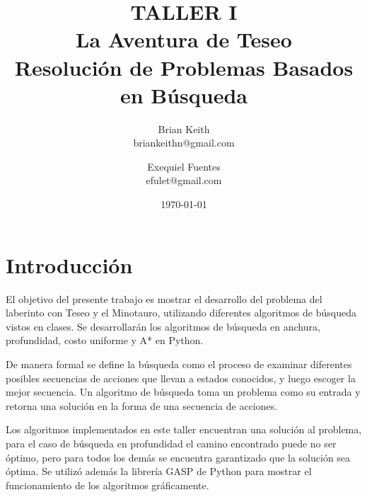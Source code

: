 \documentclass[letter, titlepage, 10pt]{article}
\title{TALLER I \\ La Aventura de Teseo \\ Resolución de Problemas Basados en Búsqueda} %
\author{Brian Keith\\
  \small briankeithn@gmail.com\\
\and
  Exequiel Fuentes\\
  \small efulet@gmail.com\\
}
\date{\today}
\begin{document}
\maketitle %




\section{Introducción}
El objetivo del presente trabajo es mostrar el desarrollo del problema del laberinto con Teseo y el Minotauro, utilizando diferentes algoritmos de búsqueda vistos en clases. Se desarrollarán los algoritmos de búsqueda en anchura, profundidad, costo uniforme y A* en Python. 

De manera formal se define la búsqueda como el proceso de examinar diferentes posibles secuencias de acciones que llevan a estados conocidos, y luego escoger la mejor secuencia. Un algoritmo de búsqueda toma un problema como su entrada y retorna una solución en la forma de una secuencia de acciones.

Los algoritmos implementados en este taller encuentran una solución al problema, para el caso de búsqueda en profundidad el camino encontrado puede no ser óptimo, pero para todos los demás se encuentra garantizado que la solución sea óptima. Se utilizó además la librería GASP de Python para mostrar el funcionamiento de los algoritmos gráficamente.
\end{document}
